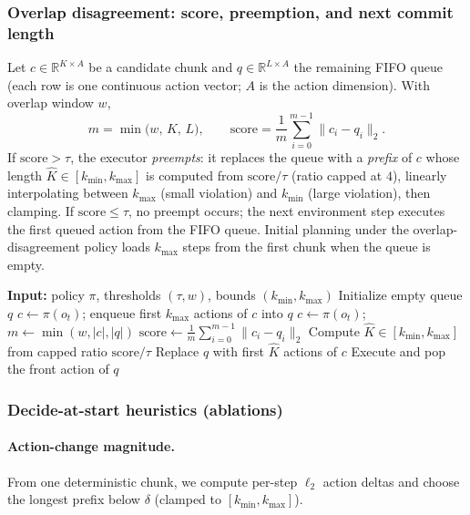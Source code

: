 \documentclass{article}
\begin{document}
\subsubsection{Overlap disagreement: score, preemption, and next commit length}
Let $c\in\mathbb{R}^{K\times A}$ be a candidate chunk and $q\in\mathbb{R}^{L\times A}$ the remaining FIFO queue (each row is one continuous action vector; $A$ is the action dimension). With overlap window $w$,
\[
m=\min\bigl(w,\,K,\,L\bigr),
\qquad
\text{score}=\frac{1}{m}\sum_{i=0}^{m-1}\bigl\|c_i-q_i\bigr\|_2 .
\]
If $\text{score}>\tau$, the executor \emph{preempts}: it replaces the queue with a \emph{prefix} of $c$ whose length $\hat{K}\in[k_{\min},k_{\max}]$ is computed from $\text{score}/\tau$ (ratio capped at $4$), linearly interpolating between $k_{\max}$ (small violation) and $k_{\min}$ (large violation), then clamping. If $\text{score}\le\tau$, no preempt occurs; the next environment step executes the first queued action from the FIFO queue. Initial planning under the overlap-disagreement policy loads $k_{\max}$ steps from the first chunk when the queue is empty.

\begin{algorithm}[H]
\caption{Overlap-disagreement execution (inference time)}
\begin{algorithmic}[1]
\State \textbf{Input:} policy $\pi$, thresholds $(\tau, w)$, bounds $(k_{\min}, k_{\max})$
\State Initialize empty queue $q$
    \State $c \gets \pi(o_t)$; enqueue first $k_{\max}$ actions of $c$ into $q$
  \Else
    \State $c \gets \pi(o_t)$; $m \gets \min(w, |c|, |q|)$
    \State $\text{score} \gets \frac{1}{m}\sum_{i=0}^{m-1}\lVert c_i - q_i \rVert_2$
      \State Compute $\hat{K}\in[k_{\min},k_{\max}]$ from capped ratio $\text{score}/\tau$
      \State Replace $q$ with first $\hat{K}$ actions of $c$
    \EndIf
  \EndIf
  \State Execute and pop the front action of $q$
\EndFor
\end{algorithmic}
\end{algorithm}

\subsubsection{Decide-at-start heuristics (ablations)}
\paragraph{Action-change magnitude.} From one deterministic chunk, we compute per-step $\ell_2$ action deltas and choose the longest prefix below $\delta$ (clamped to $[k_{\min},k_{\max}]$).
\end{document}
